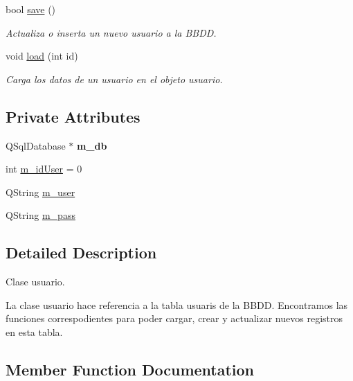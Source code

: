 \begin{DoxyCompactItemize}
bool \mbox{\hyperlink{classusuari_a033dbdad161e4dabeb4efd0c26165d0a}{save}} ()
\begin{DoxyCompactList}\small\item\em Actualiza o inserta un nuevo usuario a la B\+B\+DD. \end{DoxyCompactList}\item 
void \mbox{\hyperlink{classusuari_a88ddcdb51b491f7b6804980c88c753a9}{load}} (int id)
\begin{DoxyCompactList}\small\item\em Carga los datos de un usuario en el objeto usuario. \end{DoxyCompactList}\end{DoxyCompactItemize}
\subsection*{Private Attributes}
\begin{DoxyCompactItemize}
\item 
\mbox{\label{classusuari_a102b2012a2e1ca9cd0f73abbd3ae086d}} 
Q\+Sql\+Database $\ast$ {\bfseries m\+\_\+db}
\item 
int \mbox{\hyperlink{classusuari_a782f5e6371fec121527d11ee7bfb1298}{m\+\_\+id\+User}} = 0
\item 
Q\+String \mbox{\hyperlink{classusuari_a888f2ca58e20a8396f4d065a943e4425}{m\+\_\+user}}
\item 
Q\+String \mbox{\hyperlink{classusuari_aa9568f0272be3b558bc2e68911820f9b}{m\+\_\+pass}}
\end{DoxyCompactItemize}


\subsection{Detailed Description}
Clase usuario. 

La clase usuario hace referencia a la tabla \textquotesingle{}usuaris\textquotesingle{} de la B\+B\+DD. Encontramos las funciones correspodientes para poder cargar, crear y actualizar nuevos registros en esta tabla. 

\subsection{Member Function Documentation}
\mbox{\label{classusuari_aa8cc58aa9b8a1c8a7ef5fce3ad5fa819}} 
